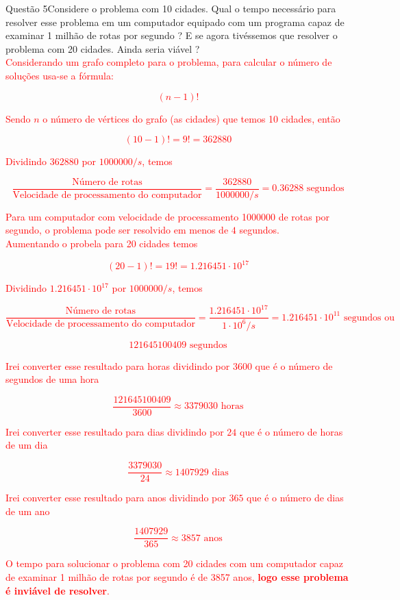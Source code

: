 \documentclass[12pt]{article}
\begin{document}
\begin{section}{Questão 5}{Considere o problema com 10 cidades. Qual o tempo necessário para resolver esse problema em um
computador equipado com um programa capaz de examinar 1 milhão de rotas por segundo ? E se agora tivéssemos que resolver o problema com 20 cidades. Ainda seria viável ?}\\

\noindent \textcolor{red}{Considerando um grafo completo para o problema, para calcular o número de soluções usa-se a fórmula:}

\textcolor{red}{$$(n-1)!$$}

\noindent \textcolor{red}{Sendo $n$ o número de vértices do grafo (as cidades) que temos 10 cidades, então}

\textcolor{red}{$$(10-1)! = 9! = 362880$$}

\noindent \textcolor{red}{Dividindo $362880$ por $1000000/s$, temos}

\textcolor{red}{$$\dfrac{\text{Número de rotas}}{\text{Velocidade de processamento do computador}} = \dfrac{362880}{1000000/s} = 0.36288 \text{ segundos}$$}

\noindent \textcolor{red}{Para um computador com velocidade de processamento 1000000 de rotas por segundo, o problema pode ser resolvido em menos de $4$ segundos.}\\

\noindent \textcolor{red}{Aumentando o probela para 20 cidades temos}

\textcolor{red}{$$(20-1)! = 19! = 1.216451 \cdot 10^{17}$$}

\noindent \textcolor{red}{Dividindo $1.216451 \cdot 10^{17}$ por $1000000/s$, temos}

\textcolor{red}{$$\dfrac{\text{Número de rotas}}{\text{Velocidade de processamento do computador}} = \dfrac{1.216451 \cdot 10^{17}}{1 \cdot 10^{6}/s} =  1.216451 \cdot 10^{11} \text{ segundos ou }$$}

\textcolor{red}{$$121645100409  \text{ segundos} $$}

\noindent \textcolor{red}{Irei converter esse resultado para horas dividindo por $3600$ que é o número de segundos de uma hora}

\textcolor{red}{$$\dfrac{121645100409}{3600} \approx  3379030 \text{ horas}$$}

\noindent \textcolor{red}{Irei converter esse resultado para dias dividindo por $24$ que é o número de horas de um dia}

\textcolor{red}{$$\dfrac{3379030}{24} \approx  1407929 \text{ dias}$$}

\noindent \textcolor{red}{Irei converter esse resultado para anos dividindo por $365$ que é o número de dias de um ano}

\textcolor{red}{$$\dfrac{1407929}{365} \approx 3857  \text{ anos}$$}

\noindent \textcolor{red}{O tempo para solucionar o problema com 20 cidades com um computador capaz de examinar 1 milhão de rotas por segundo é de 3857 anos, \textbf{logo esse problema é inviável de resolver}.}

\end{section}
\end{document}
